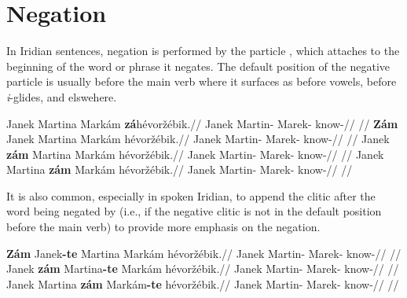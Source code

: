 \section{Negation}

In Iridian sentences, negation is performed by the particle , which attaches to the beginning of the word or phrase  it negates. The default position of the negative particle is usually before the main verb where it surfaces as  before vowels,  before \emph{i}-glides, and  elswehere.

\pex
\a
\begingl
    \gla Janek Martina Mark\'am \textbf{z\'a}h\'evor\v{z}\'ebik.//
    \glb Janek Martin- Marek- know-//
    \glft {}//
\endgl
\a
\begingl
    \gla \textbf{Z\'am} Janek Martina Mark\'am h\'evor\v{z}\'ebik.//
    \glb {} Janek Martin- Marek- know-//
    \glft {}//
\endgl
\a
\begingl
    \gla Janek \textbf{z\'am} Martina Mark\'am h\'evor\v{z}\'ebik.//
    \glb Janek  Martin- Marek- know-//
    \glft {}//
\endgl
\a
\begingl
    \gla Janek Martina \textbf{z\'am} Mark\'am h\'evor\v{z}\'ebik.//
    \glb Janek Martin-  Marek- know-//
    \glft {}//
\endgl
\xe

It is also common, especially in spoken Iridian, to append the clitic 
after the word being negated by  (i.e., if the negative clitic is not
in the default position before the main verb) to provide more emphasis on the
negation.

\pex
\a
\begingl
    \gla \textbf{Z\'am} Janek\textbf{-te} Martina Mark\'am h\'evor\v{z}\'ebik.//
    \glb {} Janek Martin- Marek- know-//
    \glft {}//
\endgl
\a
\begingl
    \gla Janek \textbf{z\'am} Martina\textbf{-te} Mark\'am h\'evor\v{z}\'ebik.//
    \glb Janek  Martin- Marek- know-//
    \glft {}//
\endgl
\a
\begingl
    \gla Janek Martina \textbf{z\'am} Mark\'am\textbf{-te} h\'evor\v{z}\'ebik.//
    \glb Janek Martin-  Marek- know-//
    \glft {}//
\endgl
\xe

